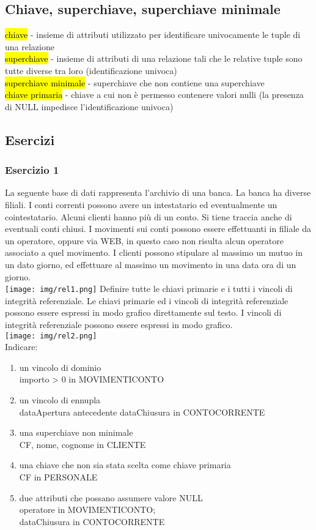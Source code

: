 \documentclass[a4paper]{article}
\begin{document}
\subsection{Chiave, superchiave, superchiave minimale}
\hl{chiave} - insieme di attributi utilizzato per identificare univocamente le tuple di una relazione\medskip\\
\hl{superchiave} - insieme di attributi di una relazione tali che le relative tuple sono tutte diverse tra loro (identificazione univoca)\medskip\\
\hl{superchiave minimale} - superchiave che non contiene una superchiave\medskip\\
\hl{chiave primaria} - chiave a cui non è permesso contenere valori nulli (la presenza di NULL impedisce l’identificazione univoca)

\subsection{Esercizi}
\subsubsection{Esercizio 1}
La seguente base di dati rappresenta l’archivio di una banca. La banca ha diverse filiali. I conti correnti possono avere un intestatario ed eventualmente un cointestatario. Alcuni clienti hanno più di un conto. Si tiene traccia anche di eventuali conti chiusi. I movimenti sui conti possono essere effettuanti in filiale da un operatore, oppure via WEB, in questo caso non risulta alcun operatore associato a quel movimento. I clienti possono stipulare al massimo un mutuo in un dato giorno, ed effettuare al massimo un movimento in una data ora di un giorno.\medskip\medskip\\
\texttt{[image: img/rel1.png]}
%
Definire tutte le chiavi primarie e i tutti i vincoli di integrità referenziale. Le chiavi primarie ed i vincoli di integrità referenziale possono essere espressi in modo grafico direttamente sul testo. I vincoli di integrità referenziale possono essere espressi in  modo grafico.\medskip\\
\texttt{[image: img/rel2.png]}\medskip\medskip\\
Indicare:
\begin{enumerate}
  \item un vincolo di dominio \\importo > 0 in MOVIMENTICONTO
  \item un vincolo di ennupla \\dataApertura antecedente dataChiusura in CONTOCORRENTE
  \item una superchiave non minimale \\CF, nome, cognome in CLIENTE
  \item una chiave che non sia stata scelta come chiave primaria \\CF in PERSONALE
  \item due attributi che possano assumere valore NULL \\operatore in MOVIMENTICONTO;\\dataChiusura in CONTOCORRENTE
\end{enumerate}
\end{document}
